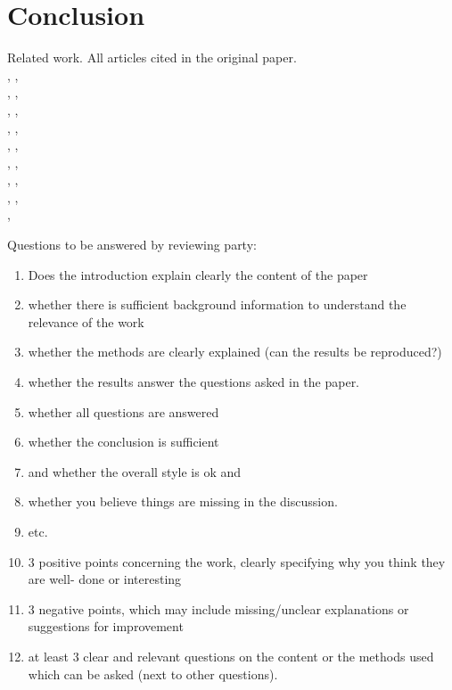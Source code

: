 \documentclass[letterpaper]{article}
\begin{document}
\section{Conclusion}
Related work. All articles cited in the original paper.\\[.5cm]
\citep{carroll2005task}, \citep{garant2015accelerating},\\ \citep{ghavamzadeh2006hierarchical}, \citep{gmytrasiewicz2005framework},\\ \citep{guestrin2002multiagent}, \citep{kitano1999robocup},\\ \citep{lazaric2008transfer}, \citep{littman2001value},\\ \citep{nair2005networked}, \citep{nedic2009distributed},\\ \citep{oliehoek2008exploiting}, \citep{price2003accelerating},\\ \citep{renyi1961measures}, \citep{taylor2009transfer},\\ \citep{vickrey2002multi}, \citep{witwicki2010influence},\\ \citep{zhang2010self}, \citep{zhang2013coordinating}

Questions to be answered by reviewing party:
\begin{enumerate}
 \item Does the introduction explain clearly the content of the paper
 \item whether there is sufficient background information to understand the relevance of the work
 \item whether the methods are clearly explained (can the results be reproduced?)
 \item whether the results answer the questions asked in the paper.
 \item whether all questions are answered
 \item whether the conclusion is sufficient
 \item and whether the overall style is ok and
 \item whether you believe things are missing in the discussion.
 \item etc.
 \item 3 positive points concerning the work, clearly specifying why you think they are well-
       done or interesting
 \item 3 negative points, which may include missing/unclear explanations or suggestions for
       improvement
 \item at least 3 clear and relevant questions on the content or the methods used which can be asked (next to other questions).
\end{enumerate}

\footnotesize


\end{document}
